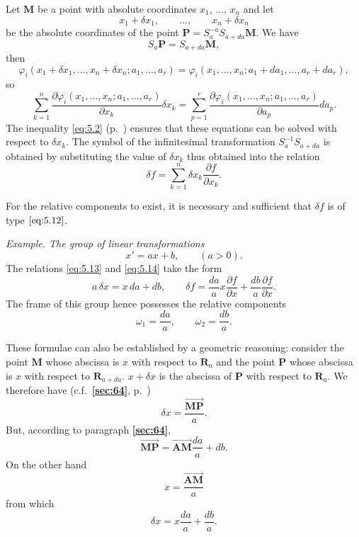 \documentclass[leqno,11pt]{book}
\makeatletter
\numberwithin{equation}{chapter}
\newcommand{\pd}{\partial}
\theoremstyle{shape1}
\theoremstyle{shapesmall}
\let\old@phi\phi
\let\old@varphi\varphi
\let\phi\old@varphi
\let\varphi\old@phi
\newcommand{\fsref}[1]{{\rm\textsection\textbf{\ref{sec:#1}}}}
\newcommand{\somespace}{\vspace{9pt}}
\makeatother
\begin{document}
Let $\mathbf{M}$ be a point with absolute coordinates $x_{1}$, $\dots$, $x_{n}$ and let
\[
x_{1}+\delta x_{1},\qquad \dots,\qquad x_{n}+\delta x_{n}
\]
be the absolute coordinates of the point $\mathbf{P}=S_{a}^{-a}S_{a+da}\mathbf{M}$. We have
\[
S_{a}\mathbf{P}=S_{a+da}\mathbf{M},
\]
then
\[
\phi_{i}(x_{1}+\delta x_{1},\dots,x_{n}+\delta x_{n};a_{1},\dots,a_{r})=\phi_{i}(x_{1},\dots,x_{n};a_{1}+da_{1},\dots,a_{r}+da_{r}),
\]
so
\begin{equation}
  \label{eq:5.13}
  \sum_{k=1}^{n}\frac{\pd \phi_{i}(x_{1},\dots,x_{n};a_{1},\dots,a_{r})}{\pd x_{k}}\delta x_{k}=\sum_{p=1}^{r}\frac{\pd \phi_{i}(x_{1},\dots,x_{n};a_{1},\dots,a_{r})}{\pd a_{p}}da_{p}.
\end{equation}
The inequality \eqref{eq:5.2} (p.~\pageref{eq:5.2}) ensures that these equations can be solved with respect to $\delta x_{k}$. The symbol of the infinitesimal transformation $S_{a}^{-1}S_{a+da}$ is obtained by substituting the value of $\delta x_{k}$ thus obtained into the relation
\begin{equation}
  \label{eq:5.14}
  \delta f=\sum_{k=1}^{n}\delta x_{k}\frac{\pd f}{\pd x_{k}}.
\end{equation}

For the relative components to exist, it is necessary and sufficient that $\delta f$ is of type $\eqref{eq:5.12}$.

\somespace

{\small
\emph{Example. The group of linear transformations}
\[
x'=ax+b,\qquad(a>0).
\]
The relations \eqref{eq:5.13} and \eqref{eq:5.14} take the form
\[
a\,\delta x=x\,da+db,\qquad\delta f=\frac{da}{a}x\frac{\pd f}{\pd x}+\frac{db}{a}\frac{\pd f}{\pd x}.
\]
The frame of this group hence possesses the relative components
\[
\omega_{1}=\frac{da}{a},\qquad\omega_{2}=\frac{db}{a}.
\]

These formulae can also be established by a geometric reasoning: consider the point $\mathbf{M}$ whose abscissa is $x$ with respect to $\mathbf{R}_{a}$ and the point $\mathbf{P}$ whose abscissa is $x$ with respect to $\mathbf{R}_{a+da}$. $x+\delta x$ is the abscissa of $\mathbf{P}$ with respect to $\mathbf{R}_{a}$. We therefore have (c.f.~\fsref{64}, p.~\pageref{sec:64})
\[
\delta x=\frac{\overrightarrow{\mathbf{MP}}}{a}.
\]
But, according to paragraph \fsref{64},
\[
\overrightarrow{\mathbf{MP}}=\overrightarrow{\mathbf{AM}}\frac{da}{a}+db.
\]
On the other hand
\[
x=\frac{\overrightarrow{\mathbf{AM}}}{a}
\]
from which
\[
\delta x=x\frac{da}{a}+\frac{db}{a}.
\]
}
\end{document}

